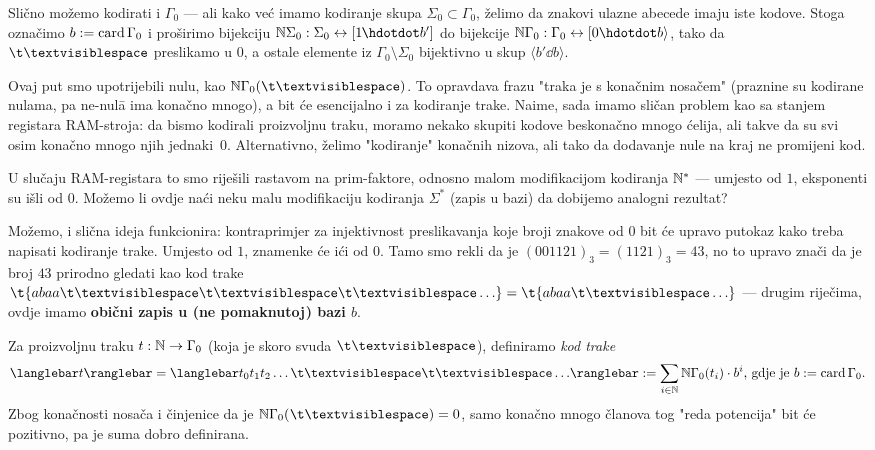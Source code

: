 Slično možemo kodirati i $\Gamma_0$ --- ali kako već imamo kodiranje skupa $\Sigma_0\subset\Gamma_0$, želimo da znakovi ulazne abecede imaju iste kodove. Stoga označimo $b:=\operatorname{card}\Gamma_0$ i proširimo bijekciju $\N\Sigma_0:\Sigma_0\leftrightarrow[1\mspace{-1mu}\dd b']$ do bijekcije $\N\Gamma_0:\Gamma_0\leftrightarrow[0\dd b\rangle$, tako da $\bl$ preslikamo u $0$, a ostale elemente iz $\Gamma_0\!\setminus\Sigma_0$ bijektivno u skup $\langle b'\dd b\rangle$.

Ovaj put smo upotrijebili nulu, kao $\N\Gamma_0(\bl)$. To opravdava frazu "traka je s konačnim nosačem" (praznine su kodirane nulama, pa ne-nul\=a ima konačno mnogo), a bit će esencijalno i za kodiranje trake. Naime, sada imamo sličan problem kao sa stanjem registara RAM-stroja: da bismo kodirali proizvoljnu traku, moramo nekako skupiti kodove beskonačno mnogo ćelija, ali takve da su svi osim konačno mnogo njih jednaki~$0$. Alternativno, želimo "kodiranje" konačnih nizova, ali tako da dodavanje nule na kraj ne promijeni kod.

U slučaju RAM-registara to smo riješili rastavom na prim-faktore, odnosno malom modifikacijom kodiranja ${\mathbb N}^*$ --- umjesto od $1$, eksponenti su išli od $0$. Možemo li ovdje naći neku malu modifikaciju kodiranja $\Sigma^*$ (zapis u bazi) da dobijemo analogni rezultat?

Možemo, i slična ideja funkcionira: kontraprimjer za injektivnost preslikavanja koje broji znakove od $0$ bit će upravo putokaz kako treba napisati kodiranje trake. Umjesto od $1$, znamenke će ići od $0$. Tamo smo rekli da je $(001121)_3=(1121)_3=43$, no to upravo znači da je broj $43$ prirodno gledati kao kod trake $\t{abaa\bl\bl\bl\ldots}=\t{abaa\bl\ldots}$ --- drugim riječima, ovdje imamo \textbf{obični zapis u (ne pomaknutoj$\mspace{1mu}$) bazi $b$}.

\begin{definicija}[{name=[kodiranje trake Turingovog stroja]}]
Za proizvoljnu traku $t:{\mathbb N}\to\Gamma_0$ (koja je skoro svuda $\bl$), definiramo \emph{kod trake} \begin{equation}
	\knk{t}=\knk{t_0t_1t_2\ldots\bl\bl\ldots}:=\sum_{i\in\N}\N\Gamma_0(t_i)\cdot b^i\text{, gdje je $b:=\card\Gamma_0$.}
\end{equation}
	Zbog konačnosti nosača i činjenice da je $\N\Gamma_0(\mspace{0.5mu}\bl)=0$, samo konačno mnogo članova tog "reda potencija" bit će pozitivno, pa je suma dobro definirana.
\end{definicija}

